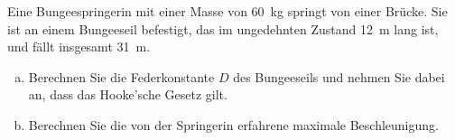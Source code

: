 \begin{aufgabe}

Eine Bungeespringerin mit einer Masse von \SI{60}{kg} springt von einer Brücke.
Sie ist an einem Bungeeseil befestigt, das im ungedehnten Zustand \SI{12}{m} lang ist,
und fällt insgesamt \SI{31}{m}.

\begin{enumerate} [a)]
\item Berechnen Sie die Federkonstante $D$ des Bungeeseils und nehmen Sie dabei an, dass das Hooke'sche Gesetz gilt.
\item Berechnen Sie die von der Springerin erfahrene maximale Beschleunigung.


\end{enumerate} 


\end{aufgabe}
